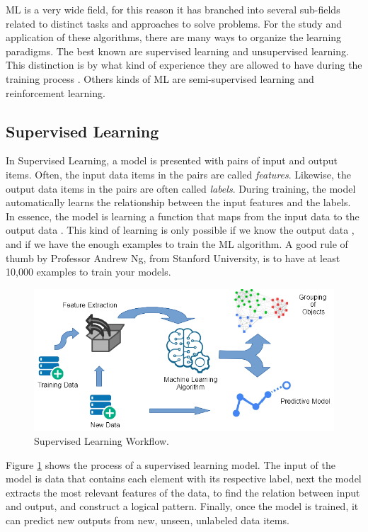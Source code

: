 \documentclass[12pt]{report}
\begin{document}
	\ac{ML} is a very wide field, for this reason it has branched into several sub-fields related to distinct tasks \cite{Shai2014} and approaches to solve problems. For the study and application of these algorithms,  there are many ways to organize the learning paradigms. The best known are supervised learning and unsupervised learning. This distinction is by what kind of experience they are allowed to have during the training process \cite{Goodfellow2016}. Others kinds of {ML} are semi-supervised learning and reinforcement learning.
	
	
	\subsection{Supervised Learning}
	In Supervised Learning, a model is presented  with pairs of input and output items. Often, the input data items in the pairs are called {\em features}.
	Likewise, the output data items in the pairs are often called  {\em labels}. 
	During training, the model automatically learns   the relationship between the input features and the labels. In 
	essence, the model is learning a  function that maps from the input data to the output data \cite{Russell2010} \cite{ Kelleher2015}. This kind of learning is only possible if we know the output data \cite{Nilsson1998}, and if we have the enough examples to train the {ML} algorithm. A good rule of thumb 
	by Professor Andrew Ng, from Stanford University, is to have at least 10,000 examples to train your models.
	
	
	\begin{figure}[H]	
		\centering	
		\includegraphics[width=150mm, scale = 1]{images/1_Supervised.png}
		\caption{Supervised Learning Workflow.}
		\label{figure:Supervised_Learning}
	\end{figure}
	
	Figure \ref{figure:Supervised_Learning} shows the process of a supervised learning model. The input of the model is data that contains each element with its respective label, next the model extracts the most relevant features of the data, to find the relation between input and output, and construct a logical pattern. Finally, once the model is trained,  it  can predict new outputs from  new, unseen, unlabeled data items.
	
\end{document}

